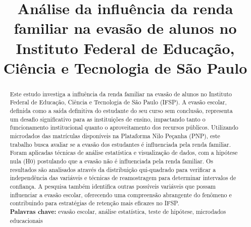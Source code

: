 \documentclass[conference]{IEEEtran}
\begin{document}
\title{Análise da influência da renda familiar na evasão de alunos no Instituto Federal de Educação, Ciência e Tecnologia de São Paulo}

\author{
\and
{}
}

\maketitle

\begin{abstract}
    Este estudo investiga a influência da renda familiar na evasão de alunos no Instituto Federal de Educação, Ciência e Tecnologia de São Paulo (IFSP). A evasão escolar, definida como a saída definitiva do estudante do seu curso sem conclusão, representa um desafio significativo para as instituições de ensino, impactando tanto o funcionamento institucional quanto o aproveitamento dos recursos públicos. Utilizando microdados das matrículas disponíveis na Plataforma Nilo Peçanha (PNP), este trabalho busca avaliar se a evasão dos estudantes é influenciada pela renda familiar. Foram aplicadas técnicas de análise estatística e visualização de dados, com a hipótese nula (H0) postulando que a evasão não é influenciada pela renda familiar. Os resultados são analisados através da distribuição qui-quadrado para verificar a independência das variáveis e técnicas de reamostragem para determinar intervalos de confiança. A pesquisa também identifica outras possíveis variáveis que possam influenciar a evasão escolar, oferecendo uma compreensão abrangente do fenômeno e contribuindo para estratégias de retenção mais eficazes no IFSP.\\
\textbf{Palavras chave: } evasão escolar, análise estatística, teste de hipótese, microdados educacionais
\vspace{2.5mm}
\end{abstract}
\end{document}
